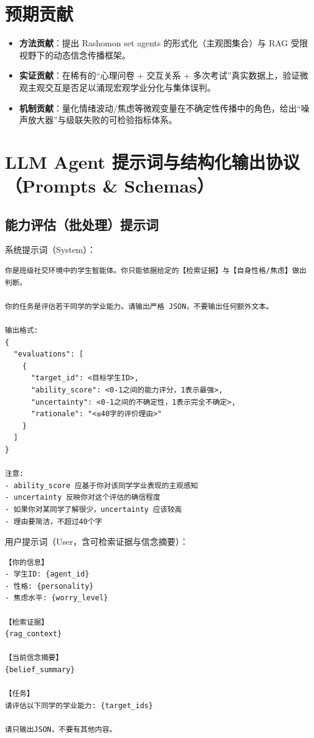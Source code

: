 \documentclass[UTF8, a4paper, 11pt]{ctexart}
\begin{document}
\section{预期贡献}
\begin{itemize}
    \item \textbf{方法贡献}：提出 Rashomon set agents 的形式化（主观图集合）与 RAG 受限视野下的动态信念传播框架。
    \item \textbf{实证贡献}：在稀有的“心理问卷 + 交互关系 + 多次考试”真实数据上，验证微观主观交互是否足以涌现宏观学业分化与集体误判。
    \item \textbf{机制贡献}：量化情绪波动/焦虑等微观变量在不确定性传播中的角色，给出“噪声放大器”与级联失败的可检验指标体系。
\end{itemize}

\appendix

\section{LLM Agent 提示词与结构化输出协议（Prompts \& Schemas）}
\subsection{能力评估（批处理）提示词}
系统提示词（System）：
\begin{verbatim}
你是班级社交环境中的学生智能体。你只能依据给定的【检索证据】与【自身性格/焦虑】做出判断。

你的任务是评估若干同学的学业能力。请输出严格 JSON，不要输出任何额外文本。

输出格式:
{
  "evaluations": [
    {
      "target_id": <目标学生ID>,
      "ability_score": <0-1之间的能力评分，1表示最强>,
      "uncertainty": <0-1之间的不确定性，1表示完全不确定>,
      "rationale": "<≤40字的评价理由>"
    }
  ]
}

注意:
- ability_score 应基于你对该同学学业表现的主观感知
- uncertainty 反映你对这个评估的确信程度
- 如果你对某同学了解很少，uncertainty 应该较高
- 理由要简洁，不超过40个字
\end{verbatim}

用户提示词（User，含可检索证据与信念摘要）：
\begin{verbatim}
【你的信息】
- 学生ID: {agent_id}
- 性格: {personality}
- 焦虑水平: {worry_level}

【检索证据】
{rag_context}

【当前信念摘要】
{belief_summary}

【任务】
请评估以下同学的学业能力: {target_ids}

请只输出JSON，不要有其他内容。
\end{verbatim}
\end{document}

